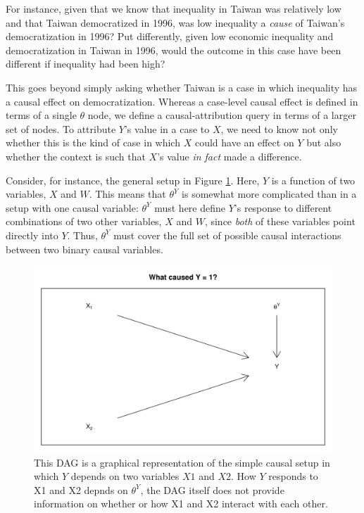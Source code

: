 \documentclass[12pt,]{book}
\begin{document}
For instance, given that we know that inequality in Taiwan was relatively low and that Taiwan democratized in 1996, was low inequality a \emph{cause} of Taiwan's democratization in 1996? Put differently, given low economic inequality and democratization in Taiwan in 1996, would the outcome in this case have been different if inequality had been high?

This goes beyond simply asking whether Taiwan is a case in which inequality has a causal effect on democratization. Whereas a case-level causal effect is defined in terms of a single \(\theta\) node, we define a causal-attribution query in terms of a larger set of nodes. To attribute \(Y\)'s value in a case to \(X\), we need to know not only whether this is the kind of case in which \(X\) could have an effect on \(Y\) but also whether the context is such that \(X\)'s value \emph{in fact} made a difference.

Consider, for instance, the general setup in Figure \ref{fig:attribquery}. Here, \(Y\) is a function of two variables, \(X\) and \(W\). This means that \(\theta^Y\) is somewhat more complicated than in a setup with one causal variable: \(\theta^Y\) must here define \(Y\)'s response to different combinations of two other variables, \(X\) and \(W\), since \emph{both} of these variables point directly into \(Y\). Thus, \(\theta^Y\) must cover the full set of possible causal interactions between two binary causal variables.

\begin{figure}

{\centering \includegraphics[width=.5\textwidth]{ii_files/figure-latex/attribquery-1} 

}

\caption{This DAG is a graphical representation of the simple causal setup in which $Y$ depends on two variables $X1$ and $X2$. How $Y$ responds to X1 and X2 depnds on $\theta^Y$, the DAG itself does not provide information on whether or how X1 and X2 interact with each other.}\label{fig:attribquery}
\end{figure}
\end{document}
